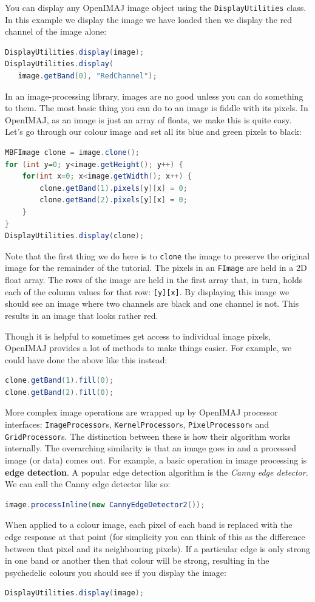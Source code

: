 \documentclass[10pt,a4paper,twoside,extrafontsizes]{memoir}
\begin{document}
You can display any OpenIMAJ image object using the \verb+DisplayUtilities+ class. In this example we display
the image we have loaded then we display the red channel of the image alone:
\begin{lstlisting}[language=java]
DisplayUtilities.display(image);
DisplayUtilities.display(
   image.getBand(0), "RedChannel");
\end{lstlisting}

In an image-processing library, images are no good unless you can do something to them. The most basic 
thing you can do to an image is fiddle with its pixels. In OpenIMAJ, as an image is just an array of 
floats, we make this is quite easy. Let's go through our colour image and set all its blue and green 
pixels to black:
\begin{lstlisting}[language=java]
MBFImage clone = image.clone();
for (int y=0; y<image.getHeight(); y++) {
    for(int x=0; x<image.getWidth(); x++) {
        clone.getBand(1).pixels[y][x] = 0;
        clone.getBand(2).pixels[y][x] = 0;
    }
}
DisplayUtilities.display(clone);
\end{lstlisting}
Note that the first thing we do here is to \verb+clone+ the image to preserve the original image
for the remainder of the tutorial. The pixels in an \verb+FImage+ are held in a 2D float array. The rows 
of the image are held in the first array that, in turn, holds each of the column values for that 
row:  \verb+[y][x]+. By displaying this image we should see an image where two channels are black 
and one channel is not. This results in an image that looks rather red.

Though it is helpful to sometimes get access to individual image pixels, OpenIMAJ provides a lot 
of methods to make things easier. For example, we could have done the above like this instead:
\begin{lstlisting}[language=java]
clone.getBand(1).fill(0);
clone.getBand(2).fill(0);
\end{lstlisting}

More complex image operations are wrapped up by OpenIMAJ processor interfaces: \verb+ImageProcessor+s, \verb+KernelProcessor+s,
\verb+PixelProcessor+s and \verb+GridProcessor+s. The distinction between these is how their algorithm works internally. The overarching similarity is that an image goes 
in and a processed image (or data) comes out. For example, a basic operation in image processing 
is \textbf{edge detection}. A popular edge detection algorithm is the \emph{Canny edge detector}. 
We can call the Canny edge detector like so:
\begin{lstlisting}[language=java]
image.processInline(new CannyEdgeDetector2());
\end{lstlisting}
When applied to a colour image, each pixel of each band is replaced with the edge response at 
that point (for simplicity you can think of this as the difference between that pixel and its 
neighbouring pixels). If a particular edge is only strong in one band or another then that 
colour will be strong, resulting in the psychedelic colours you should see if you display 
the image:
\begin{lstlisting}[language=java]
DisplayUtilities.display(image);
\end{lstlisting}
\end{document}
